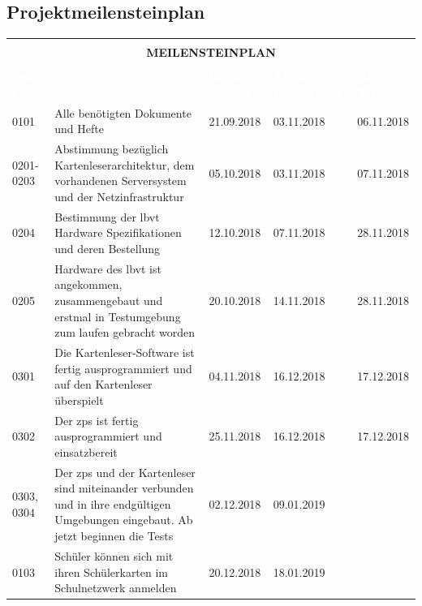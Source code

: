 \newpage 


\begingroup
\renewcommand*{\arraystretch}{1.1} %
\subsection{Projektmeilensteinplan}
\begin{center}
    \begin{tabularx}{\textwidth}{| X | p{4.5cm} | p{1.8cm} | p{1.8cm} | p{1.8cm} |}
    \hline
    \multicolumn{5}{|c|}{\vspace{-0.005cm} \rowcolor{gray}}\\
    \multicolumn{5}{|c|}{\rowcolor{gray}  \bfseries \color{white} MEILENSTEINPLAN \vspace{-0.05cm}} \\
    \multicolumn{5}{|c|}{\rowcolor{gray}}\\
    \hline \hline
    \rowcolor{gray} \textbf{\textcolor{white}{PSP-Code}} & \textbf{\textcolor{white}{Meilenstein}} & \textbf{\textcolor{white}{Basis-Termin}}& \textbf{\textcolor{white}{Aktuelle Plantermine}}& \textbf{\textcolor{white}{Ist-Termine}}\\
    \hline 
     0101& Alle benötigten Dokumente und Hefte & 21.09.2018 &03.11.2018& 06.11.2018\\
    \hline
     0201-0203& Abstimmung bezüglich Kartenleserarchitektur, dem vorhandenen Serversystem und der Netzinfrastruktur & 05.10.2018 &03.11.2018&07.11.2018\\  
    \hline
    0204& Bestimmung der \gls{lbvt} Hardware Spezifikationen und deren Bestellung & 12.10.2018 &07.11.2018&28.11.2018\\
    \hline
    0205& Hardware des \gls{lbvt} ist angekommen, zusammengebaut und erstmal in Testumgebung zum laufen gebracht worden & 20.10.2018 &14.11.2018&28.11.2018\\
    \hline
    0301& Die Kartenleser-Software ist fertig ausprogrammiert und auf den Kartenleser überspielt & 04.11.2018 &16.12.2018&17.12.2018\\
    \hline
    0302& Der \gls{zps} ist fertig ausprogrammiert und einsatzbereit & 25.11.2018 &16.12.2018&17.12.2018\\
    \hline
    0303, 0304& Der \gls{zps} und der Kartenleser sind miteinander verbunden und in ihre endgültigen Umgebungen eingebaut. Ab jetzt beginnen die Tests & 02.12.2018 &09.01.2019&\\
    \hline
    0103& Schüler können sich mit ihren Schülerkarten im Schulnetzwerk anmelden & 20.12.2018 &18.01.2019&\\
    \hline
    \end{tabularx}
\end{center}
\endgroup

